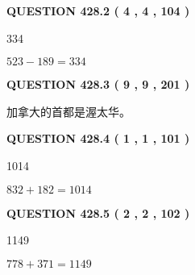 \documentclass{ctexart}
\begin{document}
{\textbf{\Large{QUESTION
428.2 
 ( 4 , 4 , 104 )
}}}
  
  
 
 
\noindent{}

334
 
 
 
 
\noindent{}

$ %
523 -  %
189=   %
334$
 
 
  
\vspace{0.2in}
  
{\textbf{\Large{QUESTION
428.3 
 ( 9 , 9 , 201 )
}}}
  
  
 
 
\noindent{}
 
 
加拿大的首都是渥太华。
 
 
 
 
  
\vspace{0.2in}
  
{\textbf{\Large{QUESTION
428.4 
 ( 1 , 1 , 101 )
}}}
  
  
 
 
\noindent{}

1014
 
 
 
 
\noindent{}

$ %
832 +  %
182=   %
1014$
 
 
  
\vspace{0.2in}
  
{\textbf{\Large{QUESTION
428.5 
 ( 2 , 2 , 102 )
}}}
  
  
 
 
\noindent{}

1149
 
 
 
 
\noindent{}

$ %
778 +  %
371=   %
1149$
 
 
  
\end{document}
